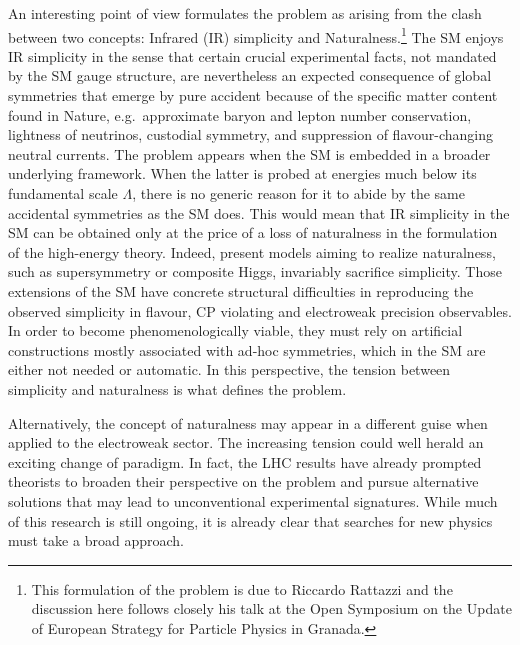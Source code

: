 \documentclass[../report.tex]{subfiles}
\begin{document}
An interesting point of view 
 formulates the problem as arising from the clash between two concepts:
 Infrared (IR) simplicity and Naturalness.\footnote{This formulation of the problem is due to Riccardo Rattazzi and the discussion here follows closely his talk at the Open Symposium on the Update of European Strategy for Particle Physics in Granada.} The SM enjoys IR simplicity in the sense that certain crucial experimental facts,  not mandated by the SM gauge structure, are nevertheless an expected consequence of global symmetries that emerge by pure accident because of the specific matter content found in Nature, e.g.\ approximate baryon and lepton number conservation, lightness of neutrinos, custodial symmetry, and suppression of flavour-changing neutral currents. The problem appears when the SM is embedded in a broader underlying framework. When the latter is probed at energies much below its fundamental scale $\Lambda$,  there is no generic reason for it to abide by the same accidental symmetries as the SM does. This would mean that IR simplicity in the SM can be obtained only at the price of a loss of naturalness in the formulation of the high-energy theory. Indeed, 
  present models aiming to realize naturalness, such as supersymmetry or composite Higgs, invariably sacrifice simplicity. Those 
 extensions of the SM have concrete structural difficulties in reproducing the observed simplicity in flavour, CP violating and electroweak precision observables. In order to become phenomenologically viable, 
 they must rely on artificial constructions mostly associated with ad-hoc symmetries, which in the SM are either not needed or automatic. In this perspective, the tension between simplicity and naturalness is what defines the problem.
 
  Alternatively, the concept of naturalness may appear in a different guise when applied to the electroweak sector. 
  The increasing tension could well herald an exciting change of paradigm. 
 In fact, the LHC results have already prompted theorists to broaden their perspective on the problem and pursue alternative solutions that may lead to unconventional experimental signatures. While much of this research is still ongoing, it is already clear that searches for new physics must take a broad approach. 
 
\end{document}
